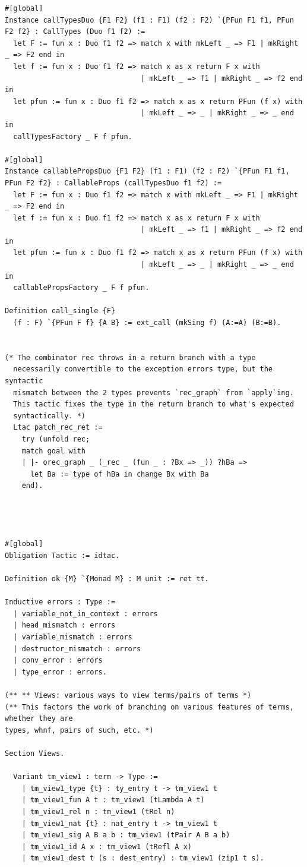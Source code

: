 \begin{lstlisting}
#[global]
Instance callTypesDuo {F1 F2} (f1 : F1) (f2 : F2) `{PFun F1 f1, PFun F2 f2} : CallTypes (Duo f1 f2) :=
  let F := fun x : Duo f1 f2 => match x with mkLeft _ => F1 | mkRight _ => F2 end in
  let f := fun x : Duo f1 f2 => match x as x return F x with
                                | mkLeft _ => f1 | mkRight _ => f2 end in
  let pfun := fun x : Duo f1 f2 => match x as x return PFun (f x) with
                                | mkLeft _ => _ | mkRight _ => _ end in
  callTypesFactory _ F f pfun.

#[global]
Instance callablePropsDuo {F1 F2} (f1 : F1) (f2 : F2) `{PFun F1 f1, PFun F2 f2} : CallableProps (callTypesDuo f1 f2) :=
  let F := fun x : Duo f1 f2 => match x with mkLeft _ => F1 | mkRight _ => F2 end in
  let f := fun x : Duo f1 f2 => match x as x return F x with
                                | mkLeft _ => f1 | mkRight _ => f2 end in
  let pfun := fun x : Duo f1 f2 => match x as x return PFun (f x) with
                                | mkLeft _ => _ | mkRight _ => _ end in
  callablePropsFactory _ F f pfun.

Definition call_single {F}
  (f : F) `{PFun F f} {A B} := ext_call (mkSing f) (A:=A) (B:=B).


(* The combinator rec throws in a return branch with a type 
  necessarily convertible to the exception errors type, but the syntactic 
  mismatch between the 2 types prevents `rec_graph` from `apply`ing.
  This tactic fixes the type in the return branch to what's expected
  syntactically. *)
  Ltac patch_rec_ret :=
    try (unfold rec;
    match goal with 
    | |- orec_graph _ (_rec _ (fun _ : ?Bx => _)) ?hBa => 
      let Ba := type of hBa in change Bx with Ba
    end).




#[global]
Obligation Tactic := idtac.

Definition ok {M} `{Monad M} : M unit := ret tt.

Inductive errors : Type :=
  | variable_not_in_context : errors
  | head_mismatch : errors
  | variable_mismatch : errors
  | destructor_mismatch : errors
  | conv_error : errors
  | type_error : errors.

(** ** Views: various ways to view terms/pairs of terms *)
(** This factors the work of branching on various features of terms, whether they are
types, whnf, pairs of such, etc. *)

Section Views.

  Variant tm_view1 : term -> Type :=
    | tm_view1_type {t} : ty_entry t -> tm_view1 t
    | tm_view1_fun A t : tm_view1 (tLambda A t)
    | tm_view1_rel n : tm_view1 (tRel n)
    | tm_view1_nat {t} : nat_entry t -> tm_view1 t
    | tm_view1_sig A B a b : tm_view1 (tPair A B a b)
    | tm_view1_id A x : tm_view1 (tRefl A x)
    | tm_view1_dest t (s : dest_entry) : tm_view1 (zip1 t s).


\end{lstlisting}
